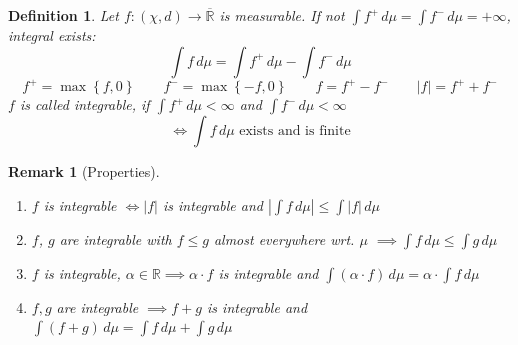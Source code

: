 \documentclass[a4paper]{article}
\newcounter{lecref}[section]
\numberwithin{lecref}{section}
\theoremstyle{break}
\newtheorem{definition}[lecref]{Definition}
\newtheorem{remark}[lecref]{Remark}
\newcommand{\Abs}[1]{\left|#1\right|}
\newcommand{\Set}[1]{\left\{#1\right\}}
\begin{document}
\begin{definition}
  Let $f: (\chi, d) \to \overline{\mathbb R}$ is measurable.
  If not $\int f^+ \, d\mu = \int f^- \, d\mu = +\infty$,
  integral exists:
  \[ \int f \, d\mu = \int f^+ \, d\mu - \int f^- \, d\mu \]
  \[ f^+ = \max\Set{f, 0} \qquad f^- = \max\Set{-f, 0} \qquad f = f^+ - f^- \qquad \Abs{f} = f^+ + f^- \]
  $f$ is called integrable, if $\int f^+ \, d\mu < \infty$ and $\int f^- \, d\mu < \infty$
  \[ \iff \int f \, d\mu \text{ exists and is finite} \]
\end{definition}

\begin{remark}[Properties]\hfill
  \begin{enumerate}
    \item $f$ is integrable $\iff \Abs{f}$ is integrable and $\Abs{\int f \, d\mu} \leq \int \Abs{f} \, d\mu$
    \item $f$, $g$ are integrable with $f \leq g$ almost everywhere wrt. $\mu$ $\implies \int f \, d\mu \leq \int g \, d\mu$
    \item $f$ is integrable, $\alpha \in \mathbb R \implies \alpha \cdot f$ is integrable and $\int (\alpha \cdot f) \, d\mu = \alpha \cdot \int f \, d\mu$
    \item $f, g$ are integrable $\implies f + g$ is integrable and $\int (f + g) \, d\mu = \int f \, d\mu + \int g \, d\mu$
  \end{enumerate}
\end{remark}

\end{document}
